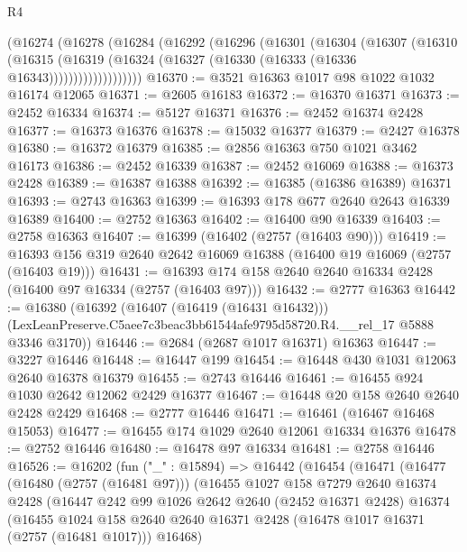 \begin{lexlean}{R4}
\begin{coremodule}
          (@16274
            (@16278
              (@16284
                (@16292
                  (@16296
                    (@16301
                      (@16304
                        (@16307
                          (@16310
                            (@16315
                              (@16319
                                (@16324 (@16327 (@16330 (@16333 (@16336 @16343)))))))))))))))))))
@16370 := @3521 @16363 @1017 @98 @1022 @1032 @16174 @12065
@16371 := @2605 @16183
@16372 := @16370 @16371
@16373 := @2452 @16334
@16374 := @5127 @16371
@16376 := @2452 @16374 @2428
@16377 := @16373 @16376
@16378 := @15032 @16377
@16379 := @2427 @16378
@16380 := @16372 @16379
@16385 := @2856 @16363 @750 @1021 @3462 @16173
@16386 := @2452 @16339
@16387 := @2452 @16069
@16388 := @16373 @2428
@16389 := @16387 @16388
@16392 := @16385 (@16386 @16389) @16371
@16393 := @2743 @16363
@16399 := @16393 @178 @677 @2640 @2643 @16339 @16389
@16400 := @2752 @16363
@16402 := @16400 @90 @16339
@16403 := @2758 @16363
@16407 := @16399 (@16402 (@2757 (@16403 @90)))
@16419 := @16393 @156 @319 @2640 @2642 @16069 @16388 (@16400 @19 @16069 (@2757 (@16403 @19)))
@16431 := @16393 @174 @158 @2640 @2640 @16334 @2428 (@16400 @97 @16334 (@2757 (@16403 @97)))
@16432 := @2777 @16363
@16442 := @16380
    (@16392
      (@16407 (@16419 (@16431 @16432)))
      (LexLeanPreserve.C5aee7c3beac3bb61544afe9795d58720.R4.__rel_17 @5888 @3346 @3170))
@16446 := @2684 (@2687 @1017 @16371) @16363
@16447 := @3227 @16446
@16448 := @16447 @199
@16454 := @16448 @430 @1031 @12063 @2640 @16378 @16379
@16455 := @2743 @16446
@16461 := @16455 @924 @1030 @2642 @12062 @2429 @16377
@16467 := @16448 @20 @158 @2640 @2640 @2428 @2429
@16468 := @2777 @16446
@16471 := @16461 (@16467 @16468 @15053)
@16477 := @16455 @174 @1029 @2640 @12061 @16334 @16376
@16478 := @2752 @16446
@16480 := @16478 @97 @16334
@16481 := @2758 @16446
@16526 := @16202
    (fun ("_" : @15894) =>
    @16442
      (@16454
        (@16471
          (@16477
            (@16480 (@2757 (@16481 @97)))
            (@16455
              @1027
              @158
              @7279
              @2640
              @16374
              @2428
              (@16447
                @242
                @99
                @1026
                @2642
                @2640
                (@2452 @16371 @2428)
                @16374
                (@16455
                  @1024
                  @158
                  @2640
                  @2640
                  @16371
                  @2428
                  (@16478 @1017 @16371 (@2757 (@16481 @1017)))
                  @16468)

\end{coremodule}
\end{lexlean}
